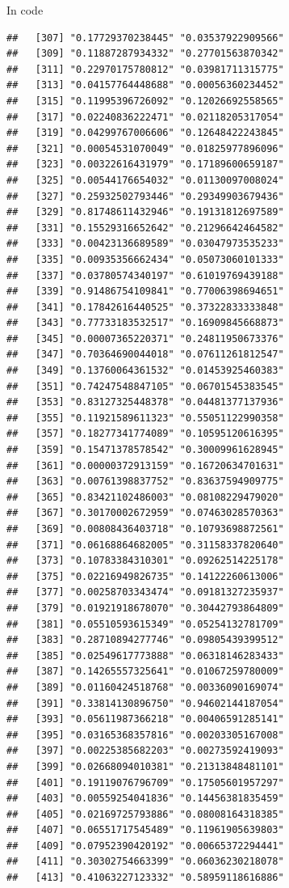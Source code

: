 \documentclass[ignorenonframetext,]{beamer}
\begin{document}
\begin{frame}[fragile]{In code}
\begin{verbatim}
##   [307] "0.17729370238445" "0.03537922909566"
##   [309] "0.11887287934332" "0.27701563870342"
##   [311] "0.22970175780812" "0.03981711315775"
##   [313] "0.04157764448688" "0.00056360234452"
##   [315] "0.11995396726092" "0.12026692558565"
##   [317] "0.02240836222471" "0.02118205317054"
##   [319] "0.04299767006606" "0.12648422243845"
##   [321] "0.00054531070049" "0.01825977896096"
##   [323] "0.00322616431979" "0.17189600659187"
##   [325] "0.00544176654032" "0.01130097008024"
##   [327] "0.25932502793446" "0.29349903679436"
##   [329] "0.81748611432946" "0.19131812697589"
##   [331] "0.15529316652642" "0.21296642464582"
##   [333] "0.00423136689589" "0.03047973535233"
##   [335] "0.00935356662434" "0.05073060101333"
##   [337] "0.03780574340197" "0.61019769439188"
##   [339] "0.91486754109841" "0.77006398694651"
##   [341] "0.17842616440525" "0.37322833333848"
##   [343] "0.77733183532517" "0.16909845668873"
##   [345] "0.00007365220371" "0.24811950673376"
##   [347] "0.70364690044018" "0.07611261812547"
##   [349] "0.13760064361532" "0.01453925460383"
##   [351] "0.74247548847105" "0.06701545383545"
##   [353] "0.83127325448378" "0.04481377137936"
##   [355] "0.11921589611323" "0.55051122990358"
##   [357] "0.18277341774089" "0.10595120616395"
##   [359] "0.15471378578542" "0.30009961628945"
##   [361] "0.00000372913159" "0.16720634701631"
##   [363] "0.00761398837752" "0.83637594909775"
##   [365] "0.83421102486003" "0.08108229479020"
##   [367] "0.30170002672959" "0.07463028570363"
##   [369] "0.00808436403718" "0.10793698872561"
##   [371] "0.06168864682005" "0.31158337820640"
##   [373] "0.10783384310301" "0.09262514225178"
##   [375] "0.02216949826735" "0.14122260613006"
##   [377] "0.00258703343474" "0.09181327235937"
##   [379] "0.01921918678070" "0.30442793864809"
##   [381] "0.05510593615349" "0.05254132781709"
##   [383] "0.28710894277746" "0.09805439399512"
##   [385] "0.02549617773888" "0.06318146283433"
##   [387] "0.14265557325641" "0.01067259780009"
##   [389] "0.01160424518768" "0.00336090169074"
##   [391] "0.33814130896750" "0.94602144187054"
##   [393] "0.05611987366218" "0.00406591285141"
##   [395] "0.03165368357816" "0.00203305167008"
##   [397] "0.00225385682203" "0.00273592419093"
##   [399] "0.02668094010381" "0.21313848481101"
##   [401] "0.19119076796709" "0.17505601957297"
##   [403] "0.00559254041836" "0.14456381835459"
##   [405] "0.02169725793886" "0.08008164318385"
##   [407] "0.06551717545489" "0.11961905639803"
##   [409] "0.07952390420192" "0.00665372294441"
##   [411] "0.30302754663399" "0.06036230218078"
##   [413] "0.41063227123332" "0.58959118616886"

\end{verbatim}
\end{frame}
\end{document}
